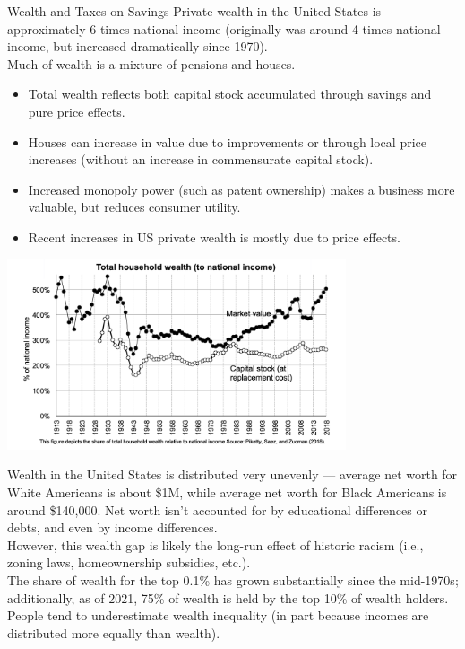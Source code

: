 \documentclass[10pt]{extarticle}
\begin{document}
  \begin{problem}{Wealth and Taxes on Savings}
    Private wealth in the United States is approximately 6 times national income (originally was around 4 times national income, but increased dramatically since 1970).\\

    Much of wealth is a mixture of pensions and houses.
    \begin{itemize}
      \item Total wealth reflects both capital stock accumulated through savings and pure price effects.
      \item Houses can increase in value due to improvements or through local price increases (without an increase in commensurate capital stock).
      \item Increased monopoly power (such as patent ownership) makes a business more valuable, but reduces consumer utility.
      \item Recent increases in US private wealth is mostly due to price effects.
    \end{itemize}
    \begin{center}
      \includegraphics[width=10cm]{images/wealth_increase.png}
    \end{center}
    Wealth in the United States is distributed very unevenly --- average net worth for White Americans is about \$1M, while average net worth for Black Americans is around \$140,000. Net worth isn't accounted for by educational differences or debts, and even by income differences.\\

    However, this wealth gap is likely the long-run effect of historic racism (i.e., zoning laws, homeownership subsidies, etc.).\\

    The share of wealth for the top 0.1\% has grown substantially since the mid-1970s; additionally, as of 2021, 75\% of wealth is held by the top 10\% of wealth holders.\\

    People tend to underestimate wealth inequality (in part because incomes are distributed more equally than wealth).
  \end{problem}
\end{document}
